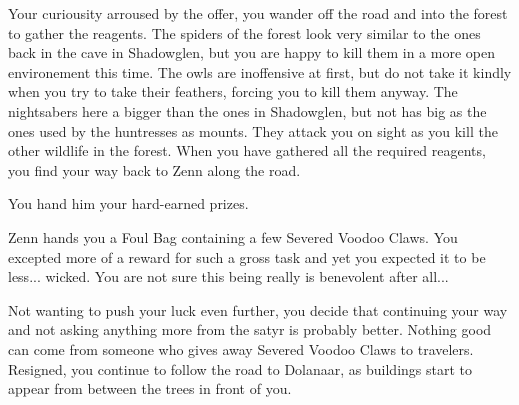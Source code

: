 Your curiousity arroused by the offer, you wander off the road and into the forest to gather the reagents. The spiders of the forest look very similar to the ones back in the cave in Shadowglen, but you are happy to kill them in a more open environement this time. The owls are inoffensive at first, but do not take it kindly when you try to take their feathers, forcing you to kill them anyway. The nightsabers here a bigger than the ones in Shadowglen, but not has big as the ones used by the huntresses as mounts. They attack you on sight as you kill the other wildlife in the forest. When you have gathered all the required reagents, you find your way back to Zenn along the road.


You hand him your hard-earned prizes.


Zenn hands you a Foul Bag containing a few Severed Voodoo Claws. You excepted more of a reward for such a gross task and yet you expected it to be less... wicked. You are not sure this being really is benevolent after all...

Not wanting to push your luck even further, you decide that continuing your way and not asking anything more from the satyr is probably better. Nothing good can come from someone who gives away Severed Voodoo Claws to travelers. Resigned, you continue to follow the road to Dolanaar, as buildings start to appear from between the trees in front of you.
